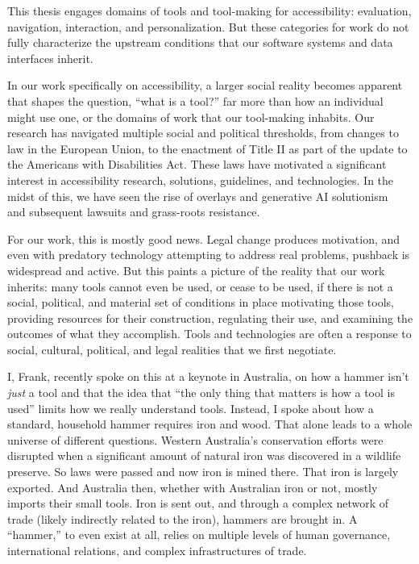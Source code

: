 \documentclass[12pt]{cmuthesis}
\begin{document}
This thesis engages domains of tools and tool-making for accessibility: evaluation, navigation, interaction, and personalization. But these categories for work do not fully characterize the upstream conditions that our software systems and data interfaces inherit.

In our work specifically on accessibility, a larger social reality becomes apparent that shapes the question, ``what is a tool?'' far more than how an individual might use one, or the domains of work that our tool-making inhabits. Our research has navigated multiple social and political thresholds, from changes to law in the European Union, to the enactment of Title II as part of the update to the Americans with Disabilities Act. These laws have motivated a significant interest in accessibility research, solutions, guidelines, and technologies. In the midst of this, we have seen the rise of overlays and generative AI solutionism~\cite{Hartman2025} and subsequent lawsuits and grass-roots resistance.

For our work, this is mostly good news. Legal change produces motivation, and even with predatory technology attempting to address real problems, pushback is widespread and active. But this paints a picture of the reality that our work inherits: many tools cannot even be used, or cease to be used, if there is not a social, political, and material set of conditions in place motivating those tools, providing resources for their construction, regulating their use, and examining the outcomes of what they accomplish. Tools and technologies are often a response to social, cultural, political, and legal realities that we first negotiate.

I, Frank, recently spoke on this at a keynote in Australia, on how a hammer isn't \textit{just} a tool and that the idea that ``the only thing that matters is how a tool is used'' limits how we really understand tools. Instead, I spoke about how a standard, household hammer requires iron and wood. That alone leads to a whole universe of different questions. Western Australia's conservation efforts were disrupted when a significant amount of natural iron was discovered in a wildlife preserve. So laws were passed and now iron is mined there. That iron is largely exported. And Australia then, whether with Australian iron or not, mostly imports their small tools. Iron is sent out, and through a complex network of trade (likely indirectly related to the iron), hammers are brought in. A ``hammer,'' to even exist at all, relies on multiple levels of human governance, international relations, and complex infrastructures of trade.
\end{document}

